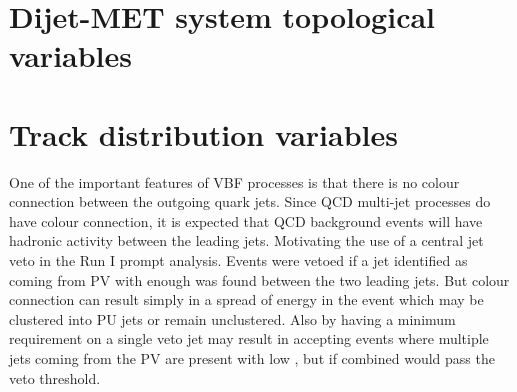 \section{Dijet-MET system topological variables}
\label{SECTION:PreparationParkedDataAnalysis_DijetMETSystemVars}
% 
% 
% 




\section{Track distribution variables}
\label{SECTION:PreparationParkedDataAnalysis_TrackDistributionVariables}


One of the important features of \gls{VBF} processes is that there is no colour connection between the outgoing quark jets. Since \gls{QCD} multi-jet processes do have colour connection, it is expected that \gls{QCD} background events will have hadronic activity between the leading jets. Motivating the use of a central jet veto in the Run I prompt analysis. Events were vetoed if a jet identified as coming from \gls{PV} with enough \pt was found between the two leading jets. But colour connection can result simply in a spread of energy in the event which may be clustered into \gls{PU} jets or remain unclustered. Also by having a minimum \pt requirement on a single veto jet may result in accepting events where multiple jets coming from the \gls{PV} are present with low \pt, but if combined would pass the veto threshold.

